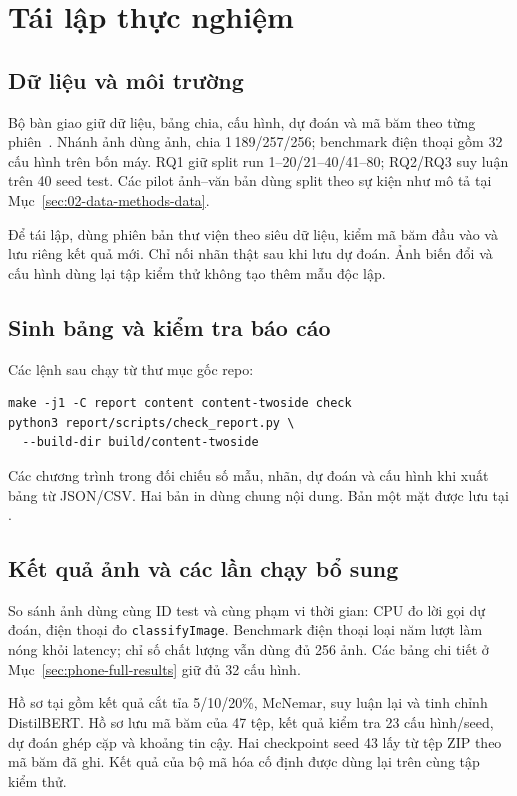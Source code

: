 \chapter{Tái lập thực nghiệm}\label{chap:reproducibility}
\section{Dữ liệu và môi trường}
Bộ bàn giao giữ dữ liệu, bảng chia, cấu hình, dự đoán và mã băm theo từng phiên~\citep{nguyen2026floodartifact}. Nhánh ảnh dùng \ImageTotal{} ảnh, chia 1\,189/257/256; benchmark điện thoại gồm 32 cấu hình trên bốn máy. RQ1 giữ split run 1--20/21--40/41--80; RQ2/RQ3 suy luận trên 40 seed test. Các pilot ảnh--văn bản dùng split theo sự kiện như mô tả tại Mục~\ref{sec:02-data-methods-data}.

Để tái lập, dùng phiên bản thư viện theo siêu dữ liệu, kiểm mã băm đầu vào và lưu riêng kết quả mới. Chỉ nối nhãn thật sau khi lưu dự đoán. Ảnh biến đổi và cấu hình dùng lại tập kiểm thử không tạo thêm mẫu độc lập.

\section{Sinh bảng và kiểm tra báo cáo}
Các lệnh sau chạy từ thư mục gốc repo:
\begin{verbatim}
make -j1 -C report content content-twoside check
python3 report/scripts/check_report.py \
  --build-dir build/content-twoside
\end{verbatim}
Các chương trình trong  đối chiếu số mẫu, nhãn, dự đoán và cấu hình khi xuất bảng từ JSON/CSV. Hai bản in dùng chung nội dung. Bản một mặt được lưu tại .

\section{Kết quả ảnh và các lần chạy bổ sung}\label{sec:local-evidence}\label{sec:phone-benchmark-evidence}
So sánh ảnh dùng cùng ID test và cùng phạm vi thời gian: CPU đo lời gọi dự đoán, điện thoại đo \texttt{classifyImage}. Benchmark điện thoại loại năm lượt làm nóng khỏi latency; chỉ số chất lượng vẫn dùng đủ 256 ảnh. Các bảng chi tiết ở Mục~\ref{sec:phone-full-results} giữ đủ 32 cấu hình.

Hồ sơ tại  gồm kết quả cắt tỉa 5/10/20\%, McNemar, suy luận lại và tinh chỉnh DistilBERT. Hồ sơ lưu mã băm của 47 tệp, kết quả kiểm tra 23 cấu hình/seed, dự đoán ghép cặp và khoảng tin cậy. Hai checkpoint seed 43 lấy từ tệp ZIP theo mã băm đã ghi. Kết quả của bộ mã hóa cố định được dùng lại trên cùng tập kiểm thử.

